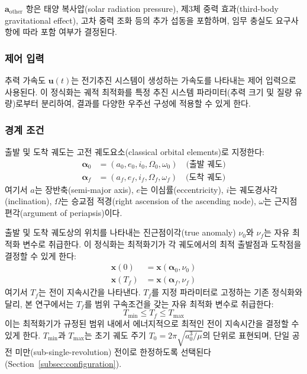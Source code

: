\documentclass[a4paper,fleqn]{cas-dc}
\begin{document}
$\mathbf{a}_{\text{other}}$ 항은 태양 복사압(solar radiation pressure), 제3체 중력 효과(third-body gravitational effect), 고차 중력 조화 등의 추가 섭동을 포함하며, 임무 충실도 요구사항에 따라 포함 여부가 결정된다.

\subsubsection{제어 입력}

추력 가속도 $\mathbf{u}(t)$는 전기추진 시스템이 생성하는 가속도를 나타내는 제어 입력으로 사용된다. 이 정식화는 궤적 최적화를 특정 추진 시스템 파라미터(추력 크기 및 질량 유량)로부터 분리하여, 결과를 다양한 우주선 구성에 적용할 수 있게 한다.

\subsubsection{경계 조건}

출발 및 도착 궤도는 고전 궤도요소(classical orbital elements)로 지정한다:
\begin{align}
\boldsymbol{\alpha}_0 &= (a_0, e_0, i_0, \Omega_0, \omega_0) \quad \text{(출발 궤도)} \\
\boldsymbol{\alpha}_f &= (a_f, e_f, i_f, \Omega_f, \omega_f) \quad \text{(도착 궤도)}
\end{align}
여기서 $a$는 장반축(semi-major axis), $e$는 이심률(eccentricity), $i$는 궤도경사각(inclination), $\Omega$는 승교점 적경(right ascension of the ascending node), $\omega$는 근지점 편각(argument of periapsis)이다.

출발 및 도착 궤도상의 위치를 나타내는 진근점이각(true anomaly) $\nu_0$와 $\nu_f$는 자유 최적화 변수로 취급한다. 이 정식화는 최적화기가 각 궤도에서의 최적 출발점과 도착점을 결정할 수 있게 한다:
\begin{align}
\mathbf{x}(0) &= \mathbf{x}(\boldsymbol{\alpha}_0, \nu_0) \\
\mathbf{x}(T_f) &= \mathbf{x}(\boldsymbol{\alpha}_f, \nu_f)
\end{align}
여기서 $T_f$는 전이 지속시간을 나타낸다. $T_f$를 지정 파라미터로 고정하는 기존 정식화와 달리, 본 연구에서는 $T_f$를 범위 구속조건을 갖는 자유 최적화 변수로 취급한다:
\begin{equation}\label{eq:tf_bounds}
T_{\min} \leq T_f \leq T_{\max}
\end{equation}
이는 최적화기가 규정된 범위 내에서 에너지적으로 최적인 전이 지속시간을 결정할 수 있게 한다. $T_{\min}$과 $T_{\max}$는 초기 궤도 주기 $T_0 = 2\pi\sqrt{a_0^3/\mu}$의 단위로 표현되며, 단일 공전 미만(sub-single-revolution) 전이로 한정하도록 선택된다(Section~\ref{subsec:configuration}).
\end{document}
